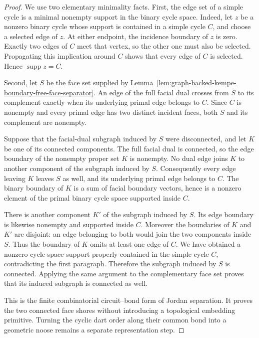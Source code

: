 \begin{proof}
We use two elementary minimality facts.  First, the edge set of a simple
cycle is a minimal nonempty support in the binary cycle space.  Indeed, let
$z$ be a nonzero binary cycle whose support is contained in a simple cycle
$C$, and choose a selected edge of $z$.  At either endpoint, the incidence
boundary of $z$ is zero.  Exactly two edges of $C$ meet that vertex, so the
other one must also be selected.  Propagating this implication around $C$
shows that every edge of $C$ is selected.  Hence
\(\operatorname{supp}z=C\).

Second, let $S$ be the face set supplied by
Lemma~\ref{lem:graph-backed-kempe-boundary-free-face-separator}.  An edge of
the full facial dual crosses from $S$ to its complement exactly when its
underlying primal edge belongs to $C$.  Since $C$ is nonempty and every
primal edge has two distinct incident faces, both $S$ and its complement are
nonempty.

Suppose that the facial-dual subgraph induced by $S$ were disconnected, and
let $K$ be one of its connected components.  The full facial dual is
connected, so the edge boundary of the nonempty proper set $K$ is nonempty.
No dual edge joins $K$ to another component of the subgraph induced by $S$.
Consequently every edge leaving $K$ leaves $S$ as well, and its underlying
primal edge belongs to $C$.  The binary boundary of $K$ is a sum of facial
boundary vectors, hence is a nonzero element of the primal binary cycle
space supported inside $C$.

There is another component $K'$ of the subgraph induced by $S$.  Its edge
boundary is likewise nonempty and supported inside $C$.  Moreover the
boundaries of $K$ and $K'$ are disjoint: an edge belonging to both would join
the two components inside $S$.  Thus the boundary of $K$ omits at least one
edge of $C$.  We have obtained a nonzero cycle-space support properly
contained in the simple cycle $C$, contradicting the first paragraph.
Therefore the subgraph induced by $S$ is connected.  Applying the same
argument to the complementary face set proves that its induced subgraph is
connected as well.

This is the finite combinatorial circuit--bond form of Jordan separation.
It proves the two connected face shores without introducing a topological
embedding primitive.  Turning the cyclic dart order along their common bond
into a geometric noose remains a separate representation step.
\end{proof}

